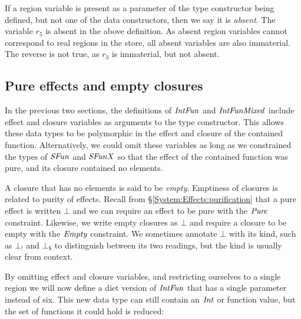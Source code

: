 If a region variable is present as a parameter of the type constructor being defined, but not one of the data constructors, then we say it is \emph{absent}. The variable $r_5$ is absent in the above definition. As absent region variables cannot correspond to real regions in the store, all absent variables are also immaterial. The reverse is not true, as $r_3$ is immaterial, but not absent.


\subsection{Pure effects and empty closures}
\label{System:Closure:empty}
In the previous two sections, the definitions of $\operatorname{\mathit{IntFun}}$ and $\operatorname{\mathit{IntFunMixed}}$ include effect and closure variables as arguments to the type constructor. This allows these data types to be polymorphic in the effect and closure of the contained function. Alternatively, we could omit these variables as long as we constrained the types of $\operatorname{\mathit{SFun}}$ and $\operatorname{\mathit{SFunX}}$ so that the effect of the contained function was pure, and its closure contained no elements. 

A closure that has no elements is said to be \emph{empty}. Emptiness of closures is related to purity of effects. Recall from \S\ref{System:Effects:purification} that a pure effect is written $\bot$ and we can require an effect to be pure with the $\operatorname{\mathit{Pure}}$ constraint. Likewise, we write empty closures as $\bot$ and require a closure to be empty with the $\operatorname{\mathit{Empty}}$ constraint. We sometimes annotate $\bot$ with its kind, such as $\bot_{!}$ and $\bot_{\$}$ to distinguish between its two readings, but the kind is usually clear from context.

By omitting effect and closure variables, and restricting ourselves to a single region we will now define a diet version of $\operatorname{\mathit{IntFun}}$ that has a single parameter instead of six. This new data type can still contain an $\operatorname{\mathit{Int}}$ or function value, but the set of functions it could hold is reduced:


\clearpage{}


